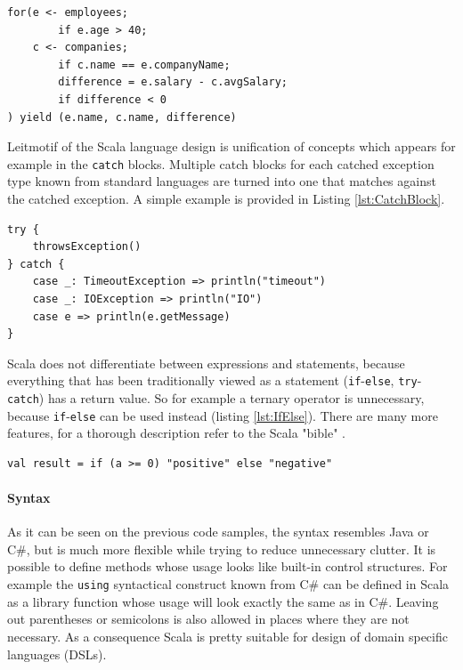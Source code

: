 \documentclass[12pt,a4paper]{report}
\begin{document}
\begin{minipage}{\linewidth}
\begin{lstlisting}[caption={For comprehension example.},label={lst:ForComprehension}]
for(e <- employees;
        if e.age > 40;
    c <- companies;
        if c.name == e.companyName;
        difference = e.salary - c.avgSalary;
        if difference < 0		
) yield (e.name, c.name, difference)
\end{lstlisting}
\end{minipage}

Leitmotif of the Scala language design is unification of concepts which appears for example in the \texttt{catch} blocks. Multiple catch blocks for each catched exception type known from standard languages are turned into one that matches against the catched exception. A simple example is provided in Listing \ref{lst:CatchBlock}.

\begin{minipage}{\linewidth}
\begin{lstlisting}[caption={Catch block example.},label={lst:CatchBlock}]
try {
    throwsException()
} catch {
    case _: TimeoutException => println("timeout")
    case _: IOException => println("IO")
    case e => println(e.getMessage)
}
\end{lstlisting}
\end{minipage}

Scala does not differentiate between expressions and statements, because everything that has been traditionally viewed as a statement (\texttt{if}-\texttt{else}, \texttt{try}-\texttt{catch}) has a return value. So for example a ternary operator is unnecessary, because \texttt{if}-\texttt{else} can be used instead (listing \ref{lst:IfElse}). There are many more features, for a thorough description refer to the Scala "bible" \cite{ScalaProgramming}.

\begin{minipage}{\linewidth}
\begin{lstlisting}[caption={\texttt{If}-\texttt{else} as a ternary operator.},label={lst:IfElse}]
val result = if (a >= 0) "positive" else "negative"
\end{lstlisting}
\end{minipage}

\paragraph{Syntax} As it can be seen on the previous code samples, the syntax resembles Java or C\#, but is much more flexible while trying to reduce unnecessary clutter. It is possible to define methods whose usage looks like built-in control structures. For example the \texttt{using} syntactical construct known from C\# can be defined in Scala as a library function whose usage will look exactly the same as in C\#. Leaving out parentheses or semicolons is also allowed in places where they are not necessary. As a consequence Scala is pretty suitable for design of domain specific languages (DSLs). 
\end{document}
